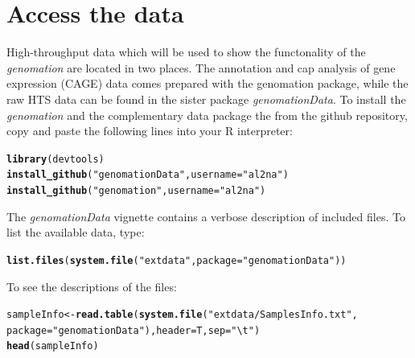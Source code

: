 \documentclass{article}\usepackage[]{graphicx}\usepackage[]{color}
\makeatletter
\newcommand{\hlstr}[1]{\textcolor[rgb]{0.192,0.494,0.8}{#1}}%
\newcommand{\hlstd}[1]{\textcolor[rgb]{0.345,0.345,0.345}{#1}}%
\newcommand{\hlkwb}[1]{\textcolor[rgb]{0.69,0.353,0.396}{#1}}%
\newcommand{\hlkwc}[1]{\textcolor[rgb]{0.333,0.667,0.333}{#1}}%
\newcommand{\hlkwd}[1]{\textcolor[rgb]{0.737,0.353,0.396}{\textbf{#1}}}%
\newenvironment{kframe}{%
 \def\at@end@of@kframe{}%
 \ifinner\ifhmode%
  \def\at@end@of@kframe{\end{minipage}}%
  \begin{minipage}{\columnwidth}%
 \fi\fi%
 \def\FrameCommand##1{\hskip\@totalleftmargin \hskip-\fboxsep
 \colorbox{shadecolor}{##1}\hskip-\fboxsep
     \hskip-\linewidth \hskip-\@totalleftmargin \hskip\columnwidth}%
 \MakeFramed {\advance\hsize-\width
   \@totalleftmargin\z@ \linewidth\hsize
   \@setminipage}}%
 {\par\unskip\endMakeFramed%
 \at@end@of@kframe}
\newenvironment{knitrout}{}{} %
\newcommand{\Rpackage}[1]{{\textit{#1}}}
\makeatother
\begin{document}
\section{Access the data}

High-throughput data which will be used to show the functonality of the 
\Rpackage{genomation} are located in two places. The annotation and cap analysis
of gene expression (CAGE) data comes prepared with the genomation package, while
the raw HTS data can be found in the sister package \Rpackage{genomationData}.
To install the \Rpackage{genomation} and the complementary data package the from
the github repository, copy and paste the following lines into your R interpreter:
\begin{knitrout}
\color{fgcolor}\begin{kframe}
\begin{alltt}
\hlkwd{library}\hlstd{(devtools)}
\hlkwd{install_github}\hlstd{(}\hlstr{"genomationData"}\hlstd{,} \hlkwc{username} \hlstd{=} \hlstr{"al2na"}\hlstd{)}
\hlkwd{install_github}\hlstd{(}\hlstr{"genomation"}\hlstd{,} \hlkwc{username} \hlstd{=} \hlstr{"al2na"}\hlstd{)}
\end{alltt}
\end{kframe}
\end{knitrout}


The \Rpackage{genomationData} vignette contains a verbose description of 
included files. 
To list the available data, type:
\begin{knitrout}
\color{fgcolor}\begin{kframe}
\begin{alltt}
\hlkwd{list.files}\hlstd{(}\hlkwd{system.file}\hlstd{(}\hlstr{"extdata"}\hlstd{,} \hlkwc{package} \hlstd{=} \hlstr{"genomationData"}\hlstd{))}
\end{alltt}
\end{kframe}
\end{knitrout}


To see the descriptions of the files:
\begin{knitrout}
\color{fgcolor}\begin{kframe}
\begin{alltt}
\hlstd{sampleInfo} \hlkwb{<-} \hlkwd{read.table}\hlstd{(}\hlkwd{system.file}\hlstd{(}\hlstr{"extdata/SamplesInfo.txt"}\hlstd{,}
    \hlkwc{package} \hlstd{=} \hlstr{"genomationData"}\hlstd{),} \hlkwc{header} \hlstd{= T,} \hlkwc{sep} \hlstd{=} \hlstr{"\textbackslash{}t"}\hlstd{)}
\hlkwd{head}\hlstd{(sampleInfo)}
\end{alltt}
\end{kframe}
\end{knitrout}
\end{document}
